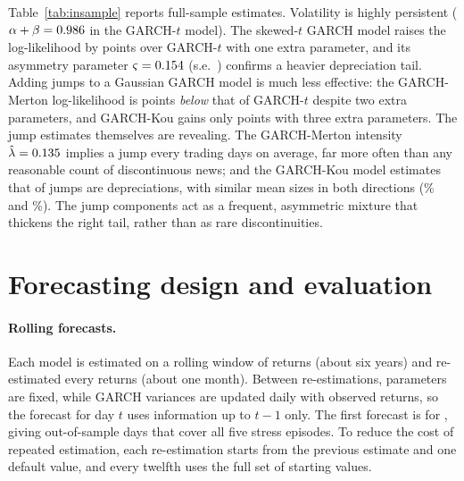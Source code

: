 \documentclass[11pt]{article}
\begin{document}
Table~\ref{tab:insample} reports full-sample estimates. Volatility is highly persistent ($\alpha+\beta = 0.986$ in the GARCH-$t$ model). The skewed-$t$ GARCH model raises the log-likelihood by \llGainSkew{} points over GARCH-$t$ with one extra parameter, and its asymmetry parameter $\varsigma = 0.154$ (s.e.\ \gsLamSe) confirms a heavier depreciation tail. Adding jumps to a Gaussian GARCH model is much less effective: the GARCH-Merton log-likelihood is \llLossMerton{} points \emph{below} that of GARCH-$t$ despite two extra parameters, and GARCH-Kou gains only \llGainKou{} points with three extra parameters. The jump estimates themselves are revealing. The GARCH-Merton intensity $\hat\lambda=0.135$ implies a jump every \gmJumpEvery{} trading days on average, far more often than any reasonable count of discontinuous news; and the GARCH-Kou model estimates that \gkPup{} of jumps are depreciations, with similar mean sizes in both directions (\gkMeanUp\% and \gkMeanDn\%). The jump components act as a frequent, asymmetric mixture that thickens the right tail, rather than as rare discontinuities.

\begin{table}[t]
\centering\small
\caption{Full-sample maximum-likelihood estimates, January 1996 -- October 2026 ($n=\nMain$). Robust QMLE standard errors in parentheses. $k$: number of parameters.}\label{tab:insample}
\resizebox{\linewidth}{!}{}
\end{table}

\section{Forecasting design and evaluation}\label{sec:eval}

\paragraph{Rolling forecasts.} Each model is estimated on a rolling window of \windowLen{} returns (about six years) and re-estimated every  returns (about one month). Between re-estimations, parameters are fixed, while GARCH variances are updated daily with observed returns, so the forecast for day $t$ uses information up to $t-1$ only. The first forecast is for \oosStart{}, giving \oosN{} out-of-sample days that cover all five stress episodes. To reduce the cost of repeated estimation, each re-estimation starts from the previous estimate and one default value, and every twelfth uses the full set of starting values.
\end{document}
